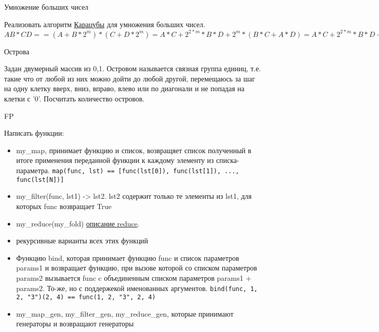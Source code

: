 \documentclass{article}
\begin{document}
\begin{center} Умножение больших чисел \end{center}
Реализовать алгоритм 
\href{http://ru.wikipedia.org/wiki/%D0%A3%D0%BC%D0%BD%D0%BE%D0%B6%D0%B5%D0%BD%D0%B8%D0%B5_%D0%9A%D0%B0%D1%80%D0%B0%D1%86%D1%83%D0%B1%D1%8B}
{Карацубы} 
для умножения больших чисел.
$AB * CD == (A + B * 2^m) * (C + D * 2^m) 
         = A * C + 2^{2*m} * B * D + 2^m * (B * C + A * D)
         = A * C + 2^{2*m} * B * D + 2^m * ((A + B)(C + D) – A * C - B * D) $
\newpage

\begin{center} Острова \end{center}
Задан двумерный массив из {0,1}. Островом называется связная группа единиц,
т.е. такие что от любой из них можно дойти до любой другой, перемещаюсь за шаг
на одну клетку вверх, вниз, вправо, влево или по диагонали и не попадая на 
клетки с '0'. Посчитать количество островов.
\newpage

\begin{center} FP \end{center}
Написать функции:
\begin{itemize}
    \item my\_map, принимает функцию и список, 
            возвращяет список полученный в итоге применения переданной функции 
            к каждому элементу из списка-параметра. 
            \lstinline!map(func, lst) == [func(lst[0]), func(lst[1]), ..., func(lst[N])]!
    \item my\_filter(func, lst1) -> lst2. lst2 содержит только те элементы из lst1,
          для которых func возвращает True
    \item my\_reduce(my\_fold) 
\href{http://ru.wikipedia.org/wiki/%D0%A1%D0%B2%D1%91%D1%80%D1%82%D0%BA%D0%B0_%D1%81%D0%BF%D0%B8%D1%81%D0%BA%D0%B0}{описание reduce}.
    \item рекурсивные варианты всех этих функций
    \item Функцию bind, которая принимает функцию func и список параметров params1
          и возвращает функцию, при вызове которой со списком параметров params2 вызывается
          func c объединенным списком параметров params1 + params2.
          То-же, но с поддержекой именованных аргументов.
          \lstinline!bind(func, 1, 2, "3")(2, 4) == func(1, 2, "3", 2, 4)!
    \item my\_map\_gen, my\_filter\_gen, my\_reduce\_gen, которые принимают генераторы и возвращают генераторы
\end{itemize}
\newpage
\end{document}
